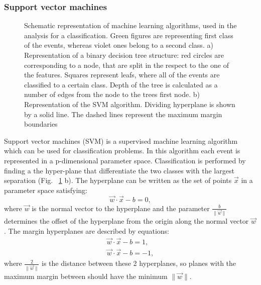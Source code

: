 \subsubsection{Support vector machines}
\begin{figure}[!tbp]
\begin{minipage}[h]{0.49\linewidth}
\end{minipage}
\hfill
\begin{minipage}[h]{0.49\linewidth}
\end{minipage}
\caption{Schematic representation of machine learning algorithms, used in the analysis for a classification. Green figures are representing first class of the events, whereas violet ones belong to a second class.  
a) Representation of a binary decision tree structure: red circles are corresponding to a node, that are split in the respect to the one of the features. Squares represent leafs, where all of the events are classified to a certain class. Depth of the tree is calculated as a number of edges from the node to the trees first node. 
b) Representation of the SVM algorithm. Dividing hyperplane is shown by a solid line. The dashed lines represent the maximum margin boundaries}
\label{fig:MLAlgo}
\end{figure}

Support vector machines (SVM) is a supervised machine learning algorithm which can be used for classification problems. In this algorithm each event is represented in a p-dimensional parameter space. Classification is performed by finding a the hyper-plane that differentiate the two classes with the largest separation (Fig. ~\ref{fig:MLAlgo} b). The hyperplane can be written as the set of points $\vec {x}$ in a parameter space satisfying:
\begin{equation}
\vec{w}\cdot \vec{x} - b = 0,
\end{equation}
where $\vec{w}$ is the normal vector to the hyperplane and the parameter $\frac {b}{\|{\vec {w}}\|}$ determines the offset of the hyperplane from the origin along the normal vector $\vec {w}$. The margin hyperplanes are described by equations:
\begin{eqnarray}
\vec{w}\cdot \vec{x} - b = 1, \\
\vec{w}\cdot \vec{x} - b = -1,
\end{eqnarray}
where $\frac{2}{\|\vec{w}\|}$ is the distance between these 2 hyperplanes, so planes with the maximum margin between should have the minimum $\|\vec{w}\|$. 

